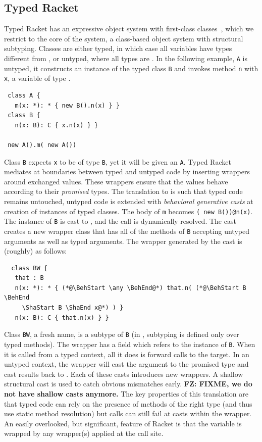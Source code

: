 \documentclass[acmlarge, anonymous, authordraft]{acmart}
\newcommand{\code}[1]{{\tt #1}\xspace}
\newcommand{\FZ}[1]{\textbf{FZ: #1}}
\begin{document}
\subsection{Typed Racket}

Typed Racket has an expressive object system with first-class
classes~\cite{Takikawa:2012}, which we restrict to the core of the system, a
class-based object system with structural subtyping. Classes are either typed,
in which case all variables have types different from \any, or untyped, where
all types are \any.  In the following example, \code A is untyped, it constructs
an instance of the typed class \code{B} and invokes method \code{n} with \code
x, a variable of type \any.

\begin{lstlisting}
 class A {
   m(x: *): * { new B().n(x) } }
 class B {
   n(x: B): C { x.n(x) } }

 new A().m( new A())
\end{lstlisting}

\noindent Class \code B expects \code x to be of type \code B, yet it will
be given an \code A. Typed Racket mediates at boundaries between typed and
untyped code by inserting wrappers around exchanged values. These wrappers
ensure that the values behave according to their \emph{promised} types. The
translation to \kafka is such that typed code remains untouched, untyped
code is extended with \emph{behavioral generative casts} at creation of
instances of typed classes. The body of \code m becomes {\tt ({\BehStart
    \any \BehEnd}new B())@n(x)}.  The instance of \code B is cast to \any,
and the call is dynamically resolved. The cast creates a new wrapper class
that has all of the methods of \code B accepting untyped arguments as well
as typed arguments. The wrapper generated by the cast is (roughly) as
follows:

\begin{lstlisting}
  class BW {
   that : B
   n(x: *): * { (*@\BehStart \any \BehEnd@*) that.n( (*@\BehStart B \BehEnd
     \ShaStart B \ShaEnd x@*) ) }
   n(x: B): C { that.n(x) } }
\end{lstlisting}

\noindent Class \code{BW}, a fresh name, is a subtype of
\code B (in \kafka, subtyping is defined only over typed methods).  The
wrapper has a field \that which refers to the instance of \code B. When it
is called from a typed context, all it does is forward calls to the
target. In an untyped context, the wrapper will cast the argument to the
promised type and cast results back to \any. Each of these casts introduces
new wrappers. A shallow structural cast is used to catch obvious mismatches
early.   \FZ{FIXME, we do not have shallow casts anymore.}
 The key properties of this translation are that typed code can rely
on the presence of methods of the right type (and thus use static method
resolution) but calls can still fail at casts within the wrapper. An easily
overlooked, but significant, feature of Racket is that the \this variable is
wrapped by any wrapper(s) applied at the call site.
\end{document}

